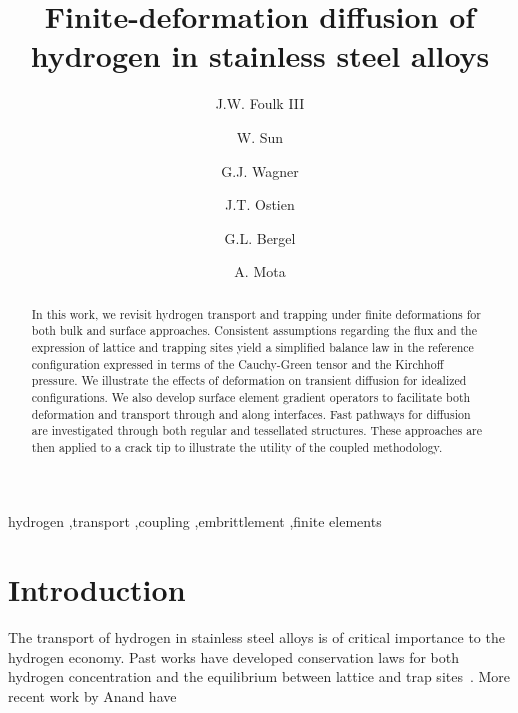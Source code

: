 \documentclass[10pt]{elsarticle}
\begin{document}
%
\begin{frontmatter}
%
\title{Finite-deformation diffusion of hydrogen in stainless steel alloys}

\author[SNL]{J.W. Foulk III} \author[UC]{W. Sun}\author[NW]{G.J. Wagner}\author[SNL]{J.T. Ostien}
\author[UCB]{G.L. Bergel} \author[SNL]{A. Mota}
\address[SNL]{Sandia National Laboratories, Livermore, CA, 94550, USA}
\address[UC]{Columbia University, New York, NY, 10027, USA}
\address[NW]{Northwestern University, Evanston, IL, 60208, USA}
\address[UCB]{University of California, Berkeley, Berkeley, CA 94720, USA}
\begin{abstract}
In this work, we revisit hydrogen transport and trapping under finite deformations for both bulk and surface approaches. Consistent assumptions regarding the flux and the expression of lattice and trapping sites yield a simplified balance law in the reference configuration expressed in terms of the Cauchy-Green tensor and the Kirchhoff pressure. We illustrate the effects of deformation on transient diffusion for idealized configurations. We also develop surface element gradient operators to facilitate both deformation and transport through and along interfaces. Fast pathways for diffusion are investigated through both regular and tessellated structures. These approaches are then applied to a crack tip to illustrate the utility of the coupled methodology.\end{abstract}
\begin{keyword}
hydrogen \sep transport \sep coupling \sep embrittlement
\sep finite elements
\end{keyword}
\end{frontmatter}
%
%
\section{Introduction}
\label{section.introduction}
The transport of hydrogen in stainless steel alloys is of critical importance to the hydrogen economy. Past works have developed conservation laws for both hydrogen concentration \citep{Sofronis1989,Krom1998} and the equilibrium between lattice and trap sites~\cite{Oriani1970}. More recent work by Anand have 
\end{document}
